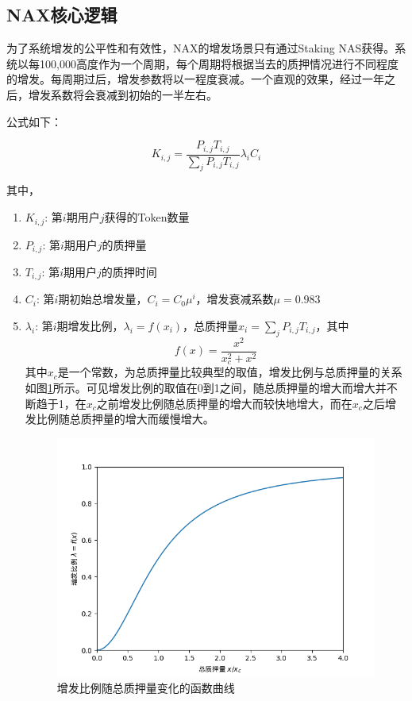 \subsection{NAX核心逻辑}
为了系统增发的公平性和有效性，NAX的增发场景只有通过Staking NAS获得。系统以每100,000高度作为一个周期，每个周期将根据当去的质押情况进行不同程度的增发。每周期过后，增发参数将以一程度衰减。一个直观的效果，经过一年之后，增发系数将会衰减到初始的一半左右。

公式如下：

\begin{equation}
  K_{i,j} = \frac{P_{i,j} T_{i,j}}{\sum_j P_{i,j} T_{i,j}} \lambda_i C_i
\end{equation}

其中，
\begin{enumerate}
   \item \(K_{i,j}\): 第\(i\)期用户\(j\)获得的Token数量
   \item \(P_{i,j}\): 第\(i\)期用户\(j\)的质押量
   \item \(T_{i,j}\): 第\(i\)期用户\(j\)的质押时间
   \item \(C_i\): 第\(i\)期初始总增发量，\(C_i=C_0 \mu^i\)，增发衰减系数$\mu=0.983$
   \item \(\lambda_i\): 第\(i\)期增发比例，\(\lambda_i = f(x_i)\)，总质押量\(x_i = \sum_j P_{i,j} T_{i,j}\)，其中
     \begin{equation}
       f(x) = \frac{x^2}{x_c^2+x^2}
     \end{equation}
     其中\(x_c\)是一个常数，为总质押量比较典型的取值，增发比例与总质押量的关系如图\ref{func}所示。可见增发比例的取值在0到1之间，随总质押量的增大而增大并不断趋于1，在\(x_c\)之前增发比例随总质押量的增大而较快地增大，而在\(x_c\)之后增发比例随总质押量的增大而缓慢增大。
    \begin{figure}
      \centering
      \includegraphics[scale=0.4]{../common/fx.png}
      \caption{增发比例随总质押量变化的函数曲线}\label{func}
    \end{figure}
\end{enumerate}

